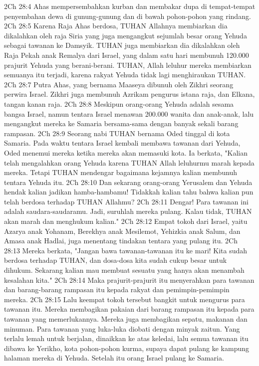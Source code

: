 2Ch 28:4  Ahas mempersembahkan kurban dan membakar dupa di tempat-tempat penyembahan dewa di gunung-gunung dan di bawah pohon-pohon yang rindang.
2Ch 28:5  Karena Raja Ahas berdosa, TUHAN Allahnya membiarkan dia dikalahkan oleh raja Siria yang juga mengangkut sejumlah besar orang Yehuda sebagai tawanan ke Damsyik. TUHAN juga membiarkan dia dikalahkan oleh Raja Pekah anak Remalya dari Israel, yang dalam satu hari membunuh 120.000 prajurit Yehuda yang berani-berani. TUHAN, Allah leluhur mereka membiarkan semuanya itu terjadi, karena rakyat Yehuda tidak lagi menghiraukan TUHAN.
2Ch 28:7  Putra Ahas, yang bernama Maaseya dibunuh oleh Zikhri seorang perwira Israel. Zikhri juga membunuh Azrikam pengurus istana raja, dan Elkana, tangan kanan raja.
2Ch 28:8  Meskipun orang-orang Yehuda adalah sesama bangsa Israel, namun tentara Israel menawan 200.000 wanita dan anak-anak, lalu mengangkut mereka ke Samaria bersama-sama dengan banyak sekali barang rampasan.
2Ch 28:9  Seorang nabi TUHAN bernama Oded tinggal di kota Samaria. Pada waktu tentara Israel kembali membawa tawanan dari Yehuda, Oded menemui mereka ketika mereka akan memasuki kota. Ia berkata, "Kalian telah mengalahkan orang Yehuda karena TUHAN Allah leluhurmu marah kepada mereka. Tetapi TUHAN mendengar bagaimana kejamnya kalian membunuh tentara Yehuda itu.
2Ch 28:10  Dan sekarang orang-orang Yerusalem dan Yehuda hendak kalian jadikan hamba-hambamu! Tidakkah kalian tahu bahwa kalian pun telah berdosa terhadap TUHAN Allahmu?
2Ch 28:11  Dengar! Para tawanan ini adalah saudara-saudaramu. Jadi, suruhlah mereka pulang. Kalau tidak, TUHAN akan marah dan menghukum kalian."
2Ch 28:12  Empat tokoh dari Israel, yaitu Azarya anak Yohanam, Berekhya anak Mesilemot, Yehizkia anak Salum, dan Amasa anak Hadlai, juga menentang tindakan tentara yang pulang itu.
2Ch 28:13  Mereka berkata, "Jangan bawa tawanan-tawanan itu ke mari! Kita sudah berdosa terhadap TUHAN, dan dosa-dosa kita sudah cukup besar untuk dihukum. Sekarang kalian mau membuat sesuatu yang hanya akan menambah kesalahan kita."
2Ch 28:14  Maka prajurit-prajurit itu menyerahkan para tawanan dan barang-barang rampasan itu kepada rakyat dan pemimpin-pemimpin mereka.
2Ch 28:15  Lalu keempat tokoh tersebut bangkit untuk mengurus para tawanan itu. Mereka membagikan pakaian dari barang rampasan itu kepada para tawanan yang memerlukannya. Mereka juga membagikan sepatu, makanan dan minuman. Para tawanan yang luka-luka diobati dengan minyak zaitun. Yang terlalu lemah untuk berjalan, dinaikkan ke atas keledai, lalu semua tawanan itu dibawa ke Yerikho, kota pohon-pohon kurma, supaya dapat pulang ke kampung halaman mereka di Yehuda. Setelah itu orang Israel pulang ke Samaria.
